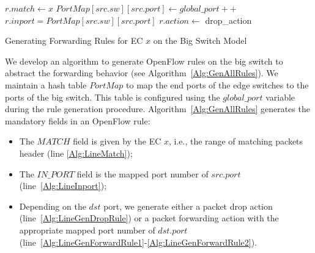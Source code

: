 \begin{algorithm}[htbp]
\DontPrintSemicolon
{}
 {
        $r.match \gets x$\;\label{Alg:LineMatch}
         {
                $PortMap[src.sw][src.port] \gets global\_port++$\;
        }
        $r.inport = PortMap[src.sw][src.port]$\;\label{Alg:LineInport}
         {
                $r.action \gets $ drop\_action\;\label{Alg:LineGenDropRule}
        }
}
\caption{Generating Forwarding Rules for EC $x$ on the Big Switch Model \label{Alg:GenAllRules}}
\end{algorithm}

We develop an algorithm to generate OpenFlow rules on the big switch to abstract the forwarding behavior (see Algorithm~\ref{Alg:GenAllRules}).
We maintain a hash table $PortMap$ to map the end ports of the edge switches to the ports of the big switch.
This table is configured using the $global\_port$ variable during the rule generation procedure.
Algorithm~\ref{Alg:GenAllRules} generates the mandatory fields in an OpenFlow rule:
\begin{itemize}
\item The $MATCH$ field is given by the EC $x$, i.e., the range of matching packets header (line \ref{Alg:LineMatch});
\item The $IN\_PORT$ field is the mapped port number of $src.port$ (line~\ref{Alg:LineInport});
\item Depending on the $dst$ port, we generate either a packet drop action (line~\ref{Alg:LineGenDropRule}) or a packet forwarding action with the appropriate mapped port number of $dst.port$ (line~\ref{Alg:LineGenForwardRule1}-\ref{Alg:LineGenForwardRule2}).
\end{itemize}
